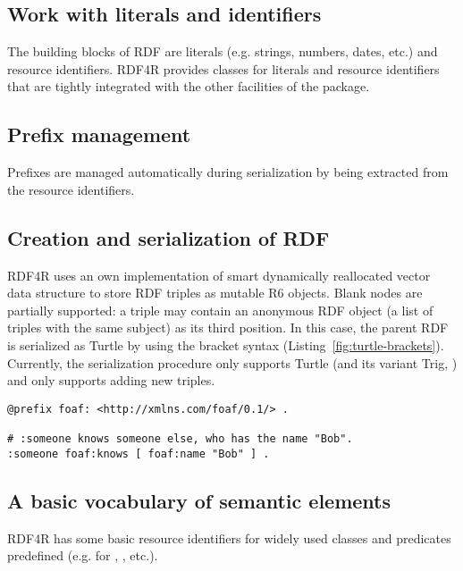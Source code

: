 \subsection{Work with literals and identifiers}

The building blocks of RDF are literals (e.g. strings, numbers, dates, etc.) and resource identifiers. RDF4R provides classes for literals and resource identifiers that are tightly integrated with the other facilities of the package.

\subsection{Prefix management}

Prefixes are managed automatically during serialization by being extracted from the resource identifiers.

\subsection{Creation and serialization of RDF}

RDF4R uses an own implementation of smart dynamically reallocated vector data structure to store RDF triples as mutable R6 objects. Blank nodes are partially supported: a triple may contain an anonymous RDF object (a list of triples with the same subject) as its third position. In this case, the parent RDF is serialized as Turtle by using the bracket syntax (Listing~\ref{fig:turtle-brackets}). Currently, the serialization procedure only supports Turtle (and its variant Trig, \cite{bizer_rdf_2014}) and only supports adding new triples.

\begin{lstlisting}[language=SPARQL,
caption=Using brackets to express RDF blank nodes in Turtle/TriG.,
label=fig:turtle-brackets,
basicstyle=\ttfamily\tiny]
@prefix foaf: <http://xmlns.com/foaf/0.1/> .

# :someone knows someone else, who has the name "Bob".
:someone foaf:knows [ foaf:name "Bob" ] .
\end{lstlisting}

\subsection{A basic vocabulary of semantic elements}

RDF4R has some basic resource identifiers for widely used classes and predicates predefined (e.g. for , , etc.).

